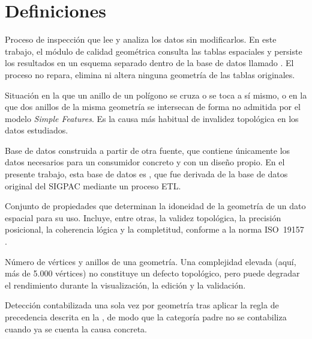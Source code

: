 \chapter*{Definiciones}
{}
\label{ch:definiciones}


\begin{description}[leftmargin=0pt, labelindent=0pt, labelsep=0pt, style=nextline, itemsep=0.9em, font=\normalfont\bfseries]

	 Proceso de inspección que lee y analiza los datos sin modificarlos. En este trabajo, el módulo de calidad geométrica consulta las tablas espaciales y persiste los resultados en un esquema separado dentro de la base de datos llamado . El proceso no repara, elimina ni altera ninguna geometría de las tablas originales.

	 Situación en la que un anillo de un polígono se cruza o se toca a sí mismo, o en la que dos anillos de la misma geometría se intersecan de forma no admitida por el modelo \emph{Simple Features}. Es la causa más habitual de invalidez topológica en los datos estudiados.

	 Base de datos construida a partir de otra fuente, que contiene únicamente los datos necesarios para un consumidor concreto y con un diseño propio. En el presente trabajo, esta base de datos es , que fue derivada de la base de datos original del SIGPAC mediante un proceso ETL.

	 Conjunto de propiedades que determinan la idoneidad de la geometría de un dato espacial para su uso. Incluye, entre otras, la validez topológica, la precisión posicional, la coherencia lógica y la completitud, conforme a la norma ISO~19157 \parencite{iso19157}.

	 Número de vértices y anillos de una geometría. Una complejidad elevada (aquí, más de 5.000 vértices) no constituye un defecto topológico, pero puede degradar el rendimiento durante la visualización, la edición y la validación.

	 Detección contabilizada una sola vez por geometría tras aplicar la regla de precedencia descrita en la , de modo que la categoría padre  no se contabiliza cuando ya se cuenta la causa concreta.


\end{description}
